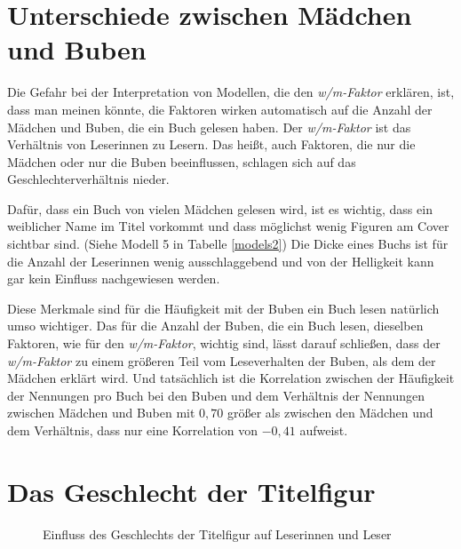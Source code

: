 





\section{Unterschiede zwischen Mädchen und Buben}

Die Gefahr bei der Interpretation von Modellen, die den
\emph{w/m-Faktor} erklären, ist, dass man meinen könnte, die Faktoren
wirken automatisch auf die Anzahl der Mädchen und Buben, die ein Buch
gelesen haben. Der \emph{w/m-Faktor} ist das Verhältnis von Leserinnen
zu Lesern. Das heißt, auch Faktoren, die nur die Mädchen oder nur die
Buben beeinflussen, schlagen sich auf das Geschlechterverhältnis nieder.

Dafür, dass ein Buch von vielen Mädchen gelesen wird, ist es wichtig,
dass ein weiblicher Name im Titel vorkommt und dass möglichst wenig
Figuren am Cover sichtbar sind. (Siehe Modell 5 in Tabelle
\ref{models2}) Die Dicke eines Buchs ist für die Anzahl der Leserinnen
wenig ausschlaggebend und von der Helligkeit kann gar kein Einfluss
nachgewiesen werden.

Diese Merkmale sind für die Häufigkeit mit der Buben ein Buch lesen
natürlich umso wichtiger. Das für die Anzahl der Buben, die ein Buch
lesen, dieselben Faktoren, wie für den \emph{w/m-Faktor}, wichtig sind,
lässt darauf schließen, dass der \emph{w/m-Faktor} zu einem größeren
Teil vom Leseverhalten der Buben, als dem der Mädchen erklärt wird. Und
tatsächlich ist die Korrelation zwischen der Häufigkeit der Nennungen
pro Buch bei den Buben und dem Verhältnis der Nennungen zwischen Mädchen
und Buben mit $0{,}70$ größer als zwischen den Mädchen und dem
Verhältnis, dass nur eine Korrelation von $-0{,}41$ aufweist.

\section{Das Geschlecht der Titelfigur}

\begin{figure}
\center
  \label{titelfig}
  \small

  \caption[Einfluss des Geschlechts der Titelfigur]{Einfluss des Geschlechts der Titelfigur auf Leserinnen und Leser}
\end{figure}

